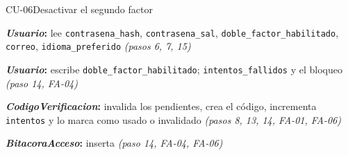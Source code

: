 \begin{fichacu}{CU-06}{Desactivar el segundo factor}
{\begin{cudatos}
      \item \textbf{\textit{Usuario}:} lee \texttt{contrasena\_\allowbreak{}hash}, \texttt{contrasena\_\allowbreak{}sal}, \texttt{doble\_\allowbreak{}factor\_\allowbreak{}habilitado}, \texttt{correo}, \texttt{idioma\_\allowbreak{}preferido} \textit{(pasos 6, 7, 15)}
      \item \textbf{\textit{Usuario}:} escribe \texttt{doble\_\allowbreak{}factor\_\allowbreak{}habilitado}; \texttt{intentos\_\allowbreak{}fallidos} y el bloqueo \textit{(paso 14, \mbox{FA-04})}
      \item \textbf{\textit{CodigoVerificacion}:} invalida los pendientes, crea el código, incrementa \texttt{intentos} y lo marca como usado o invalidado \textit{(pasos 8, 13, 14, \mbox{FA-01}, \mbox{FA-06})}
      \item \textbf{\textit{BitacoraAcceso}:} inserta \textit{(paso 14, \mbox{FA-04}, \mbox{FA-06})}
    \end{cudatos}} \\ \hline
\end{fichacu}
\clearpage
